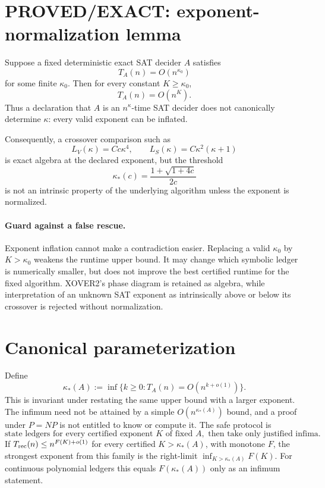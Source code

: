 \documentclass[11pt]{article}
\begin{document}
\section*{PROVED/EXACT: exponent-normalization lemma}
Suppose a fixed deterministic exact SAT decider \(A\) satisfies
\[
T_A(n)=O(n^{\kappa_0})
\]
for some finite \(\kappa_0\). Then for every constant \(K\ge\kappa_0\),
\[
T_A(n)=O(n^K).
\]
Thus a declaration that \(A\) is an \(n^\kappa\)-time SAT decider does not canonically determine \(\kappa\): every valid exponent can be inflated.

Consequently, a crossover comparison such as
\[
L_V(\kappa)=C c\kappa^4,\qquad L_S(\kappa)=C\kappa^2(\kappa+1)
\]
is exact algebra at the declared exponent, but the threshold
\[
\kappa_*(c)=\frac{1+\sqrt{1+4c}}{2c}
\]
is not an intrinsic property of the underlying algorithm unless the exponent is normalized.

\paragraph{Guard against a false rescue.}
Exponent inflation cannot make a contradiction easier. Replacing a valid \(\kappa_0\) by \(K>\kappa_0\) weakens the runtime upper bound. It may change which symbolic ledger is numerically smaller, but does not improve the best certified runtime for the fixed algorithm. XOVER2's phase diagram is retained as algebra, while interpretation of an unknown SAT exponent as intrinsically above or below its crossover is rejected without normalization.

\section*{Canonical parameterization}
Define
\[
\kappa_*(A):=\inf\{k\ge0:T_A(n)=O(n^{k+o(1)})\}.
\]
This is invariant under restating the same upper bound with a larger exponent. The infimum need not be attained by a simple \(O(n^{\kappa_*(A)})\) bound, and a proof under \(P=NP\) is not entitled to know or compute it. The safe protocol is
\[
\boxed{\text{state ledgers for every certified exponent }K\text{ of fixed }A,\text{ then take only justified infima.}}
\]
If \(T_{\rm rec}(n)\le n^{F(K)+o(1)}\) for every certified \(K>\kappa_*(A)\), with monotone \(F\), the strongest exponent from this family is the right-limit \(\inf_{K>\kappa_*(A)}F(K)\). For continuous polynomial ledgers this equals \(F(\kappa_*(A))\) only as an infimum statement.
\end{document}

